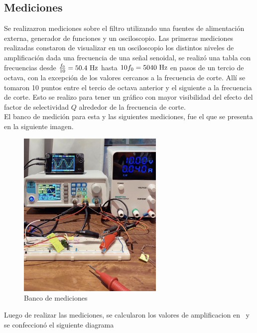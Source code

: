 \subsection*{Mediciones}

Se realizazron mediciones sobre el filtro utilizando una fuentes de alimentaci\'on externa, generador de funciones y un osciloscopio. Las primeras mediciones realizadas constaron de visualizar en un osciloscopio los distintos niveles de amplificaci\'on dada una frecuencia de una señal senoidal, se realiz\'o una tabla con frecuencias desde $\frac{f_0}{10}=50.4\ \si{\hertz}$ hasta $10 f_0=5040\ \si{\hertz}$ en pasos de un tercio de octava, con la excepci\'on de los valores cercanos a la frecuencia de corte. All\'i se tomaron 10 puntos entre el tercio de octava anterior y el siguiente a la frecuencia de corte. Esto se realizo para tener un gr\'afico con mayor visibilidad del efecto del factor de selectividad $Q$ alrededor de la frecuencia de corte.\\
El banco de medici\'on para esta y las siguientes mediciones, fue el que se presenta en la siguiente imagen.

\begin{centering}
\begin{figure}[h]
	\centering
	\includegraphics[width=7cm]{imagenes/BancoMedicion.JPG}	\caption{Banco de mediciones}	
\end{figure}
\end{centering}

\pagebreak

Luego de realizar las mediciones, se calcularon los valores de amplificacion en \dB\ y se confeccion\'o el siguiente diagrama

